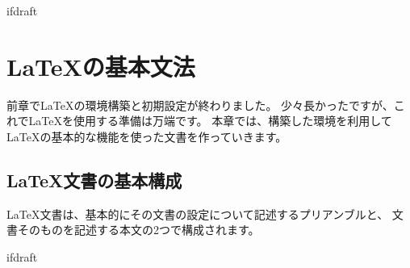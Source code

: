 \expandafter\ifx\csname ifdraft\endcsname\relax
    
    \graphicspath{{./figure/}}

\fi

\chapter{\LaTeX の基本文法}
    前章で\LaTeX の環境構築と初期設定が終わりました。
    少々長かったですが、これで\LaTeX を使用する準備は万端です。
    本章では、構築した環境を利用して\LaTeX の基本的な機能を使った文書を作っていきます。

    \section{\LaTeX 文書の基本構成}
        \LaTeX 文書は、基本的にその文書の設定について記述するプリアンブルと、
        文書そのものを記述する本文の2つで構成されます。

			\expandafter\ifx\csname ifdraft\endcsname\relax

\fi